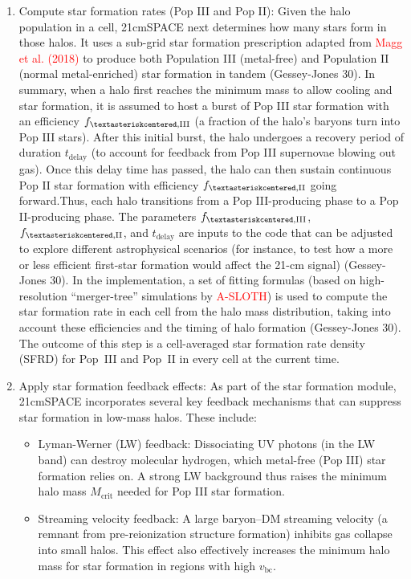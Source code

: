 \documentclass[floats,floatfix,showpacs,amssymb,prd,superscriptaddress,nofootinbib]{revtex4-2} %
\newcommand{\red}{\textcolor{red}}
\begin{document}
\begin{enumerate}
    \item Compute star formation rates (Pop III and Pop II): Given the halo population in a cell, 21cmSPACE next determines how many stars form in those halos. It uses a sub-grid star formation prescription adapted from \red{Magg et al. (2018)} to produce both Population III (metal-free) and Population II (normal metal-enriched) star formation in tandem (Gessey-Jones 30). In summary, when a halo first reaches the minimum mass to allow cooling and star formation, it is assumed to host a burst of Pop III star formation with an efficiency $f_{\textasteriskcentered,\text{III}}$ (a fraction of the halo’s baryons turn into Pop III stars). After this initial burst, the halo undergoes a recovery period of duration $t_{\text{delay}}$ (to account for feedback from Pop III supernovae blowing out gas). Once this delay time has passed, the halo can then sustain continuous Pop II star formation with efficiency $f_{\textasteriskcentered,\text{II}}$ going forward.Thus, each halo transitions from a Pop III-producing phase to a Pop II-producing phase. The parameters $f_{\textasteriskcentered,\text{III}}$, $f_{\textasteriskcentered,\text{II}}$, and $t_{\text{delay}}$ are inputs to the code that can be adjusted to explore different astrophysical scenarios (for instance, to test how a more or less efficient first-star formation would affect the 21-cm signal) (Gessey-Jones 30). In the implementation, a set of fitting formulas (based on high-resolution “merger-tree” simulations by \red{A-SLOTH}) is used to compute the star formation rate in each cell from the halo mass distribution, taking into account these efficiencies and the timing of halo formation (Gessey-Jones 30). The outcome of this step is a cell-averaged star formation rate density (SFRD) for Pop III and Pop II in every cell at the current time.

    \item Apply star formation feedback effects: As part of the star formation module, 21cmSPACE incorporates several key feedback mechanisms that can suppress star formation in low-mass halos. These include:
    \begin{itemize}
        \item Lyman-Werner (LW) feedback: Dissociating UV photons (in the LW band) can destroy molecular hydrogen, which metal-free (Pop III) star formation relies on. A strong LW background thus raises the minimum halo mass $M_{\text{crit}}$ needed for Pop III star formation.

        \item Streaming velocity feedback: A large baryon–DM streaming velocity (a remnant from pre-reionization structure formation) inhibits gas collapse into small halos. This effect also effectively increases the minimum halo mass for star formation in regions with high $v_{\text{bc}}$.


\end{itemize}
\end{enumerate}
\end{document}
